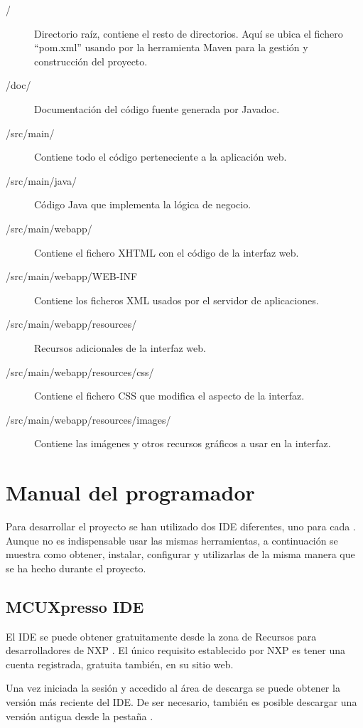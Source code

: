 \begin{description}
  \item[/] Directorio raíz, contiene el resto de directorios. Aquí se ubica el
  fichero ``pom.xml'' usando por la herramienta Maven para la gestión y
  construcción del proyecto.
  \item[/doc/] Documentación del código fuente generada por Javadoc.
  \item[/src/main/] Contiene todo el código perteneciente a la aplicación web.
  \item[/src/main/java/] Código Java que implementa la lógica de negocio.
  \item[/src/main/webapp/] Contiene el fichero XHTML con el código de la
  interfaz web.
  \item[/src/main/webapp/WEB-INF] Contiene los ficheros XML usados por
  el servidor de aplicaciones.
  \item[/src/main/webapp/resources/] Recursos adicionales de la interfaz web.
  \item[/src/main/webapp/resources/css/] Contiene el fichero CSS que modifica el
  aspecto de la interfaz.
  \item[/src/main/webapp/resources/images/] Contiene las imágenes y otros
  recursos gráficos a usar en la interfaz.
\end{description}



\section{Manual del programador}
Para desarrollar el proyecto se han utilizado dos IDE diferentes, uno para cada
\sw{}. Aunque no es indispensable usar las mismas herramientas, a continuación
se muestra como obtener, instalar, configurar y utilizarlas de la misma
manera que se ha hecho durante el proyecto.


\subsection{MCUXpresso IDE} \label{sec:man-dev-mcuxpresso}
El IDE se puede obtener gratuitamente desde la zona de Recursos para
desarrolladores de NXP \cite{webpage:mcuxpresso}. El único requisito establecido
por NXP es tener una cuenta registrada, gratuita también, en su sitio web.

Una vez iniciada la sesión y accedido al área de descarga se puede obtener
la versión más reciente del IDE. De ser necesario, también es posible descargar
una versión antigua desde la pestaña .


